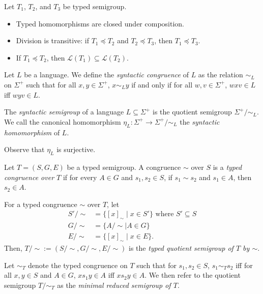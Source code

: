 \documentclass[a4paper,UKenglish,cleveref, autoref, thm-restate, anonymous]{lipics-v2021}
\begin{document}
\begin{proposition}\label{prop:typedsemigroupprops}
    Let $T_1$, $T_2$, and $T_3$ be typed semigroup.
    \begin{itemize}
        \item Typed homomorphisms are closed under composition.
        \item Division is transitive: if $T_1 \preceq T_2$ and $T_2 \preceq T_3$, then $T_1 \preceq T_3$.
        \item If $T_1 \preceq T_2$, then $\mathcal{L}(T_1) \subseteq \mathcal{L}(T_2)$.
    \end{itemize}
\end{proposition}

\begin{definition}\label{def:syncong}
    Let $L$ be a language. We define the \emph{syntactic congruence} of $L$ as the relation $\sim_L$ on $\Sigma^+$ such that for all $x, y \in \Sigma^+$, $x \sim_L y$ if and only if for all $w,v \in \Sigma^+$, $wxv \in L$ iff $wyv \in L$.
\end{definition}
\begin{definition}
    The \emph{syntactic semigroup} of a language $L \subseteq \Sigma^+$ is the quotient semigroup $\Sigma^+/{\sim_L}$. We call the canonical homomorphism $\eta_L : \Sigma^+ \to \Sigma^+/{\sim_L}$ the \emph{syntactic homomorphism} of $L$.
\end{definition}
\begin{remark}
    Observe that $\eta_L$ is surjective.
\end{remark}

\begin{definition}\label{def:typedcongmin}
    Let $T = (S, G, E)$ be a typed semigroup. A congruence $\sim$ over $S$ is a \emph{typed congruence over $T$} if for every $A \in G$ and $s_1,s_2\in S$, if $s_1 \sim s_2$ and $s_1 \in A$, then $s_2 \in A$.

    For a typed congruence $\sim$ over $T$, let
    \begin{align*}
        S'/{\sim} &= \{[x]_\sim \mid x \in S'\} \text{ where $S' \subseteq S$}\\
        G/{\sim} &= \{A/{\sim} \mid A \in G\}\\
        E/{\sim} &= \{[x]_\sim \mid x \in E\}.
    \end{align*}
    \noindent Then, $T/{\sim} := (S/{\sim}, G/{\sim}, E/{\sim})$ is the \emph{typed quotient semigroup of $T$ by $\sim$}.

    Let $\sim_T$ denote the typed congruence on $T$ such that for $s_1,s_2 \in S$, $s_1 \sim_T s_2$ iff for all $x,y \in S$ and $A \in G$, $xs_1y \in A$ iff $xs_2y \in A$. We then refer to the quotient semigroup $T/{\sim_T}$ as the \emph{minimal reduced semigroup of $T$}.
\end{definition}
\end{document}
